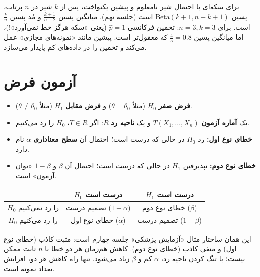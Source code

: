 \begin{example}
برای سکه‌ای با احتمال شیر نامعلوم و پیشین یکنواخت، پس از $k$ شیر در $n$ پرتاب، پسین $\mathrm{Beta}(k+1,n-k+1)$ است (جلسه نهم). میانگین پسین $\frac{k+1}{n+2}$ و مُد پسین $\frac{k}{n}$ است. برای $n=3,k=3$: تخمین فرکانسی $\hat p=1$ (یعنی «سکه هرگز خط نمی‌آورد»!)، اما میانگین پسین $\frac45=0.8$ که معقول‌تر است. پیشین مانند «نمونه‌های مجازی» عمل می‌کند و تخمین را در داده‌های کم پایدار می‌سازد.
\end{example}

\section{آزمون فرض }

\begin{definition}
\begin{itemize}
\item \textbf{فرض صفر} $H_0$ (مثلاً $\theta=\theta_0$) و \textbf{فرض مقابل} $H_1$ (مثلاً $\theta\ne\theta_0$).
\item یک \textbf{آماره آزمون} $T(X_1,\ldots,X_n)$ و یک \textbf{ناحیه رد} $R$: اگر $T\in R$، $H_0$ را رد می‌کنیم.
\item \textbf{خطای نوع اول:} رد $H_0$ در حالی که درست است؛ احتمال آن \textbf{سطح معناداری} $\alpha$ نام دارد.
\item \textbf{خطای نوع دوم:} نپذیرفتن $H_1$ در حالی که درست است؛ احتمال آن $\beta$ و $1-\beta$ «توان آزمون» است.
\end{itemize}
\end{definition}

\begin{center}
\renewcommand{\arraystretch}{1.4}
\begin{tabular}{c|c|c}
 & $H_0$ درست است & $H_1$ درست است\\\hline
$H_0$ را رد نمی‌کنیم & تصمیم درست ($1-\alpha$) & خطای نوع دوم ($\beta$)\\
$H_0$ را رد می‌کنیم & خطای نوع اول ($\alpha$) & تصمیم درست ($1-\beta$)
\end{tabular}
\end{center}

\begin{note}
\notetitle این همان ساختار مثال «آزمایش پزشکی» جلسه چهارم است: مثبت کاذب (خطای نوع اول) و منفی کاذب (خطای نوع دوم). کاهش هم‌زمان هر دو خطا با $n$ ثابت ممکن نیست؛ با تنگ کردن ناحیه رد، $\alpha$ کم و $\beta$ زیاد می‌شود. تنها راه کاهش هر دو، افزایش تعداد نمونه است.
\end{note}

